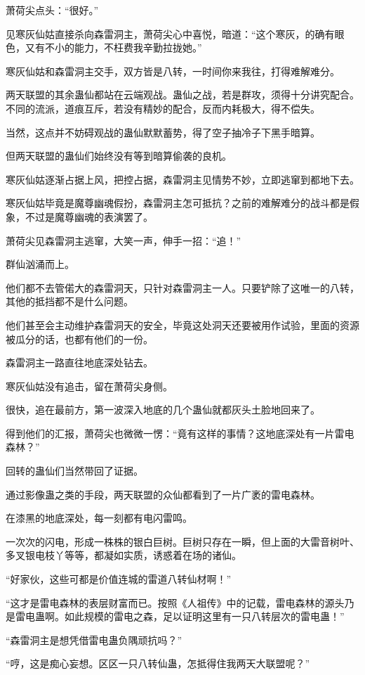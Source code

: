 \begin{this_body}
萧荷尖点头：“很好。”

见寒灰仙姑直接杀向森雷洞主，萧荷尖心中喜悦，暗道：“这个寒灰，的确有眼色，又有不小的能力，不枉费我辛勤拉拢她。”

寒灰仙姑和森雷洞主交手，双方皆是八转，一时间你来我往，打得难解难分。

两天联盟的其余蛊仙都站在云端观战。蛊仙之战，若是群攻，须得十分讲究配合。不同的流派，道痕互斥，若没有精妙的配合，反而内耗极大，得不偿失。

当然，这点并不妨碍观战的蛊仙默默蓄势，得了空子抽冷子下黑手暗算。

但两天联盟的蛊仙们始终没有等到暗算偷袭的良机。

寒灰仙姑逐渐占据上风，把控占据，森雷洞主见情势不妙，立即逃窜到都地下去。

寒灰仙姑毕竟是魔尊幽魂假扮，森雷洞主怎可抵抗？之前的难解难分的战斗都是假象，不过是魔尊幽魂的表演罢了。

萧荷尖见森雷洞主逃窜，大笑一声，伸手一招：“追！”

群仙汹涌而上。

他们都不去管偌大的森雷洞天，只针对森雷洞主一人。只要铲除了这唯一的八转，其他的抵挡都不是什么问题。

他们甚至会主动维护森雷洞天的安全，毕竟这处洞天还要被用作试验，里面的资源被瓜分的话，也都有他们的一份。

森雷洞主一路直往地底深处钻去。

寒灰仙姑没有追击，留在萧荷尖身侧。

很快，追在最前方，第一波深入地底的几个蛊仙就都灰头土脸地回来了。

得到他们的汇报，萧荷尖也微微一愣：“竟有这样的事情？这地底深处有一片雷电森林？”

回转的蛊仙们当然带回了证据。

通过影像蛊之类的手段，两天联盟的众仙都看到了一片广袤的雷电森林。

在漆黑的地底深处，每一刻都有电闪雷鸣。

一次次的闪电，形成一株株的银白巨树。巨树只存在一瞬，但上面的大雷音树叶、多叉银电枝丫等等，都凝如实质，诱惑着在场的诸仙。

“好家伙，这些可都是价值连城的雷道八转仙材啊！”

“这才是雷电森林的表层财富而已。按照《人祖传》中的记载，雷电森林的源头乃是雷电蛊啊。如此规模的雷电之森，足以证明这里有一只八转层次的雷电蛊！”

“森雷洞主是想凭借雷电蛊负隅顽抗吗？”

“哼，这是痴心妄想。区区一只八转仙蛊，怎抵得住我两天大联盟呢？”


\end{this_body}
